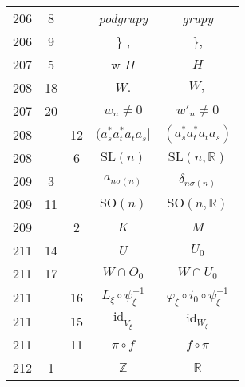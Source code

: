 \documentclass[a4paper,11pt]{article}
\newcommand{\mb}{\mathbb}
\newcommand{\mr}{\mathrm}
\newcommand{\id}{\mr{id}}
\newcommand{\SO}{\mr{SO}}
\newcommand{\SL}{\mr{SL}}
\newcommand{\del}{\delta}
\newcommand{\vp}{\varphi}
\newcommand{\s}{\sigma}
\newcommand{\R}{\mb{R}}
\newcommand{\Z}{\mb{Z}}
\newcommand{\wt}{\widetilde}
\begin{document}
\begin{center}
\begin{tabular}{|c|c|c|c|c|}
    206 &  8 & & \emph{podgrupy} & \emph{grupy} \\
    206 &  9 & & \} , & \}, \\
    207 &  5 & & w $H$ & $H$ \\
    208 & 18 & & $W.$ & $W,$ \\
    207 & 20 & & $w_{ n } \neq 0$ & $w'_{ n } \neq 0$ \\
    208 & & 12 & $( a^{ * }_{ s } a^{ * }_{ t } a_{ t } a_{ s } |$
           & $( a^{ * }_{ s } a^{ * }_{ t } a_{ t } a_{ s } )$ \\
    208 & &  6 & $\SL( n )$ & $\SL( n, \R )$ \\
    209 &  3 & & $a_{ n \s( n ) }$ & $\del_{ n \s( n ) }$ \\
    209 & 11 & & $\SO( n )$ & $\SO( n, \R )$ \\
    209 & &  2 & $K$ & $M$ \\
    211 & 14 & & $U$ & $U_{ 0 }$ \\
    211 & 17 & & $W \! \cap \! O_{ 0 }$ & $W \! \cap \! U_{ 0 }$ \\
    211 & & 16 & $L_{ \xi } \circ \psi_{ \xi }^{ -1 }$
           & $\vp_{ \xi } \circ i_{ 0 } \circ \psi_{ \xi }^{ -1 }$ \\
    211 & & 15 & $\id_{ \wt{ V }_{ \xi } }$ & $\id_{ W_{ \xi } }$ \\
    211 & & 11 & $\pi \circ f$ & $f \circ \pi$ \\
    212 &  1 & & $\Z$ & $\R$ \\
    \hline
  \end{tabular}


\end{center}
\end{document}
